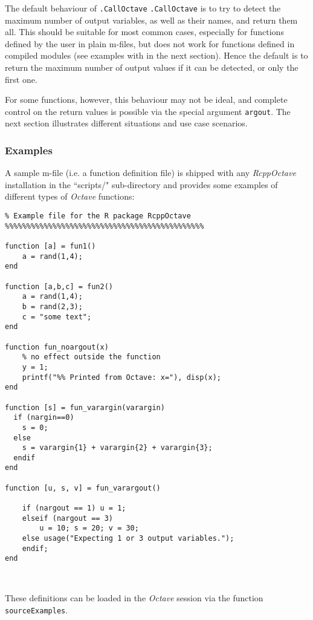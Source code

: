 \documentclass[english,10pt,a4paper]{article}\usepackage[]{graphicx}\usepackage[]{color}
\let\proglang=\textit
\let\code=\texttt
\newcommand{\pkgname}[1]{\textit{#1}\xspace}
\newcommand{\octave}{\proglang{Octave}\xspace}
\begin{document}
The default behaviour of \code{.CallOctave} \code{.CallOctave} is to try to
detect the maximum number of output variables, as well as their names, and
return them all.
This should be suitable for most common cases, especially for functions
defined by the user in plain m-files, but does not work for functions defined in
compiled modules (see examples with in the next section).
Hence the default is to return the maximum number of output values if it can be
detected, or only the first one.

For some functions, however, this behaviour may not be ideal, and complete
control on the return values is possible via the special argument \code{argout}.
The next section illustrates different situations and use case scenarios.

\subsubsection{Examples}

A sample m-file (i.e. a function definition file) is shipped with any 
\pkgname{RcppOctave} installation in the ``scripts/" sub-directory and provides
some examples of different types of \octave functions:

\begin{Verbatim}[frame=single]
%%%%%%%%%%%%%%%%%%%%%%%%%%%%%%%%%%%%%%%%%%%%%%
% Example file for the R package RcppOctave
%%%%%%%%%%%%%%%%%%%%%%%%%%%%%%%%%%%%%%%%%%%%%%

function [a] = fun1()
	a = rand(1,4);
end

function [a,b,c] = fun2()
	a = rand(1,4);
	b = rand(2,3);
	c = "some text";
end

function fun_noargout(x) 
	% no effect outside the function
	y = 1;
	printf("%% Printed from Octave: x="), disp(x);
end

function [s] = fun_varargin(varargin)
  if (nargin==0)
	s = 0;
  else
	s = varargin{1} + varargin{2} + varargin{3};
  endif
end

function [u, s, v] = fun_varargout()

	if (nargout == 1) u = 1; 
	elseif (nargout == 3)
		u = 10; s = 20; v = 30; 
	else usage("Expecting 1 or 3 output variables.");
	endif; 
end



\end{Verbatim}

These definitions can be loaded in the \octave session via the function
\code{sourceExamples}.
\end{document}
